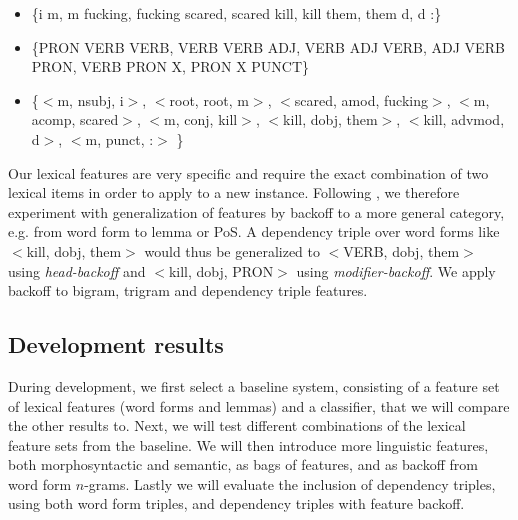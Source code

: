 \documentclass[11pt,letterpaper]{article}
\begin{document}
\begin{itemize}
\setlength\itemsep{0em}
\item \{i m,  m fucking, fucking scared, scared kill, kill them,  them d,  d :\}

\item \{PRON VERB VERB, VERB VERB ADJ, VERB ADJ VERB, ADJ VERB PRON,  VERB PRON X,  PRON X PUNCT\}

\item \{$<$m, nsubj, i$>$, $<$root, root, m$>$, $<$scared, amod, fucking$>$, $<$m, acomp, scared$>$, $<$m, conj, kill$>$, $<$kill, dobj, them$>$, $<$kill, advmod, d$>$, $<$m, punct, :$>$ \}
\end{itemize}
Our lexical features are very specific and require the exact
combination of two lexical items in order to apply to a new instance.
Following , we therefore experiment with
generalization of features by backoff to a more general category,
e.g. from word form to lemma or PoS. A dependency triple over word
forms like $<$kill, dobj, them$>$ would thus be generalized to
$<$VERB, dobj, them$>$ using \emph{head-backoff} and $<$kill, dobj,
PRON$>$ using \emph{modifier-backoff}. We apply backoff to bigram,
trigram and dependency triple features.



\subsection{Development results}

During development, we first select a baseline system, consisting of a feature set of lexical features (word forms and lemmas) and a classifier, that we will compare the other results to. Next, we will test different combinations of the lexical feature sets from the baseline. We will then introduce more linguistic features, both morphosyntactic and semantic, as bags of features, and as backoff from word form $n$-grams. Lastly we will evaluate the inclusion of dependency triples, using both word form triples, and dependency triples with feature backoff.
\end{document}
